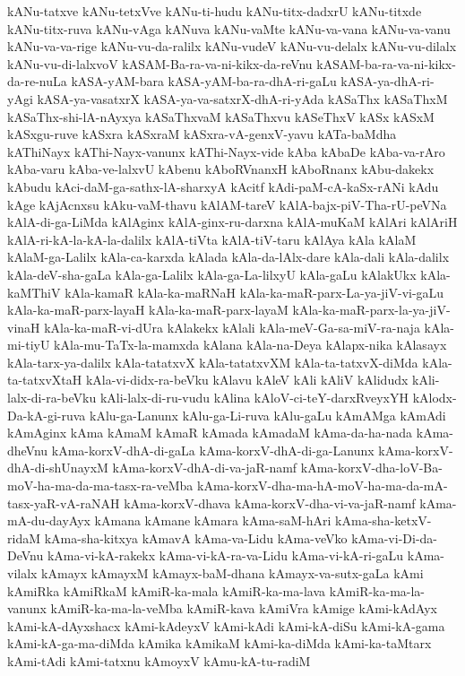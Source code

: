 {kANu-tatxve
kANu-tetxVve
kANu-ti-hudu
kANu-titx-dadxrU
kANu-titxde
kANu-titx-ruva
kANu-vAga
kANuva
kANu-vaMte
kANu-va-vana
kANu-va-vanu
kANu-va-va-rige
kANu-vu-da-ralilx
kANu-vudeV
kANu-vu-delalx
kANu-vu-dilalx
kANu-vu-di-lalxvoV
kASAM-Ba-ra-va-ni-kikx-da-reVnu
kASAM-ba-ra-va-ni-kikx-da-re-nuLa
kASA-yAM-bara
kASA-yAM-ba-ra-dhA-ri-gaLu
kASA-ya-dhA-ri-yAgi
kASA-ya-vasatxrX
kASA-ya-va-satxrX-dhA-ri-yAda
kASaThx
kASaThxM
kASaThx-shi-lA-nAyxya
kASaThxvaM
kASaThxvu
kASeThxV
kASx
kASxM
kASxgu-ruve
kASxra
kASxraM
kASxra-vA-genxV-yavu
kATa-baMdha
kAThiNayx
kAThi-Nayx-vanunx
kAThi-Nayx-vide
kAba
kAbaDe
kAba-va-rAro
kAba-varu
kAba-ve-lalxvU
kAbenu
kAboRVnanxH
kAboRnanx
kAbu-dakekx
kAbudu
kAci-daM-ga-sathx-lA-sharxyA
kAcitf
kAdi-paM-cA-kaSx-rANi
kAdu
kAge
kAjAcnxsu
kAku-vaM-thavu
kAlAM-tareV
kAlA-bajx-piV-Tha-rU-peVNa
kAlA-di-ga-LiMda
kAlAginx
kAlA-ginx-ru-darxna
kAlA-muKaM
kAlAri
kAlAriH
kAlA-ri-kA-la-kA-la-dalilx
kAlA-tiVta
kAlA-tiV-taru
kAlAya
kAla
kAlaM
kAlaM-ga-Lalilx
kAla-ca-karxda
kAlada
kAla-da-lAlx-dare
kAla-dali
kAla-dalilx
kAla-deV-sha-gaLa
kAla-ga-Lalilx
kAla-ga-La-lilxyU
kAla-gaLu
kAlakUkx
kAla-kaMThiV
kAla-kamaR
kAla-ka-maRNaH
kAla-ka-maR-parx-La-ya-jiV-vi-gaLu
kAla-ka-maR-parx-layaH
kAla-ka-maR-parx-layaM
kAla-ka-maR-parx-la-ya-jiV-vinaH
kAla-ka-maR-vi-dUra
kAlakekx
kAlali
kAla-meV-Ga-sa-miV-ra-naja
kAla-mi-tiyU
kAla-mu-TaTx-la-mamxda
kAlana
kAla-na-Deya
kAlapx-nika
kAlasayx
kAla-tarx-ya-dalilx
kAla-tatatxvX
kAla-tatatxvXM
kAla-ta-tatxvX-diMda
kAla-ta-tatxvXtaH
kAla-vi-didx-ra-beVku
kAlavu
kAleV
kAli
kAliV
kAlidudx
kAli-lalx-di-ra-beVku
kAli-lalx-di-ru-vudu
kAlina
kAloV-ci-teY-darxRveyxYH
kAlodx-Da-kA-gi-ruva
kAlu-ga-Lanunx
kAlu-ga-Li-ruva
kAlu-gaLu
kAmAMga
kAmAdi
kAmAginx
kAma
kAmaM
kAmaR
kAmada
kAmadaM
kAma-da-ha-nada
kAma-dheVnu
kAma-korxV-dhA-di-gaLa
kAma-korxV-dhA-di-ga-Lanunx
kAma-korxV-dhA-di-shUnayxM
kAma-korxV-dhA-di-va-jaR-namf
kAma-korxV-dha-loV-Ba-moV-ha-ma-da-ma-tasx-ra-veMba
kAma-korxV-dha-ma-hA-moV-ha-ma-da-mA-tasx-yaR-vA-raNAH
kAma-korxV-dhava
kAma-korxV-dha-vi-va-jaR-namf
kAma-mA-du-dayAyx
kAmana
kAmane
kAmara
kAma-saM-hAri
kAma-sha-ketxV-ridaM
kAma-sha-kitxya
kAmavA
kAma-va-Lidu
kAma-veVko
kAma-vi-Di-da-DeVnu
kAma-vi-kA-rakekx
kAma-vi-kA-ra-va-Lidu
kAma-vi-kA-ri-gaLu
kAma-vilalx
kAmayx
kAmayxM
kAmayx-baM-dhana
kAmayx-va-sutx-gaLa
kAmi
kAmiRka
kAmiRkaM
kAmiR-ka-mala
kAmiR-ka-ma-lava
kAmiR-ka-ma-la-vanunx
kAmiR-ka-ma-la-veMba
kAmiR-kava
kAmiVra
kAmige
kAmi-kAdAyx
kAmi-kA-dAyxshacx
kAmi-kAdeyxV
kAmi-kAdi
kAmi-kA-diSu
kAmi-kA-gama
kAmi-kA-ga-ma-diMda
kAmika
kAmikaM
kAmi-ka-diMda
kAmi-ka-taMtarx
kAmi-tAdi
kAmi-tatxnu
kAmoyxV
kAmu-kA-tu-radiM
}
